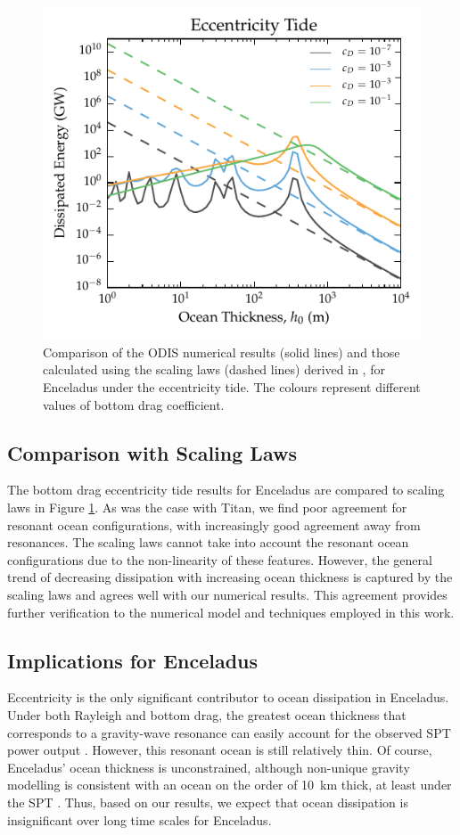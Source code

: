 \begin{figure}[!t]
\centering
\includegraphics[width=0.55\linewidth]{Figures/enceladus_scaling}
\caption{Comparison of the ODIS numerical results (solid lines) and those calculated using the scaling laws (dashed lines) derived in \citet{chen2013tidal}, for Enceladus under the eccentricity tide. The colours represent different values of bottom drag coefficient. \label{fig:scalEncel}}
\end{figure}

\subsection{Comparison with Scaling Laws}

The bottom drag eccentricity tide results for Enceladus are compared to \citet{chen2013tidal} scaling laws in Figure \ref{fig:scalEncel}. As was the case with Titan, we find poor agreement for resonant ocean configurations, with increasingly good agreement away from resonances. The scaling laws cannot take into account the resonant ocean configurations due to the non-linearity of these features. However, the general trend of decreasing dissipation with increasing ocean thickness is captured by the scaling laws and agrees well with our numerical results. This agreement provides further verification to the numerical model and techniques employed in this work.

\subsection{Implications for Enceladus}

Eccentricity is the only significant contributor to ocean dissipation in Enceladus. Under both Rayleigh and bottom drag, the greatest ocean thickness that corresponds to a gravity-wave resonance can easily account for the observed SPT power output \citep{spencer2006cassini,howett2011high,spencer2013new}. However, this resonant ocean is still relatively thin. Of course, Enceladus' ocean thickness is unconstrained, although non-unique gravity modelling is consistent with an ocean on the order of \SI{10}{\kilo\metre} thick, at least under the SPT \citep{iess2014gravity}. Thus, based on our results, we expect that ocean dissipation is insignificant over long time scales for Enceladus. 

